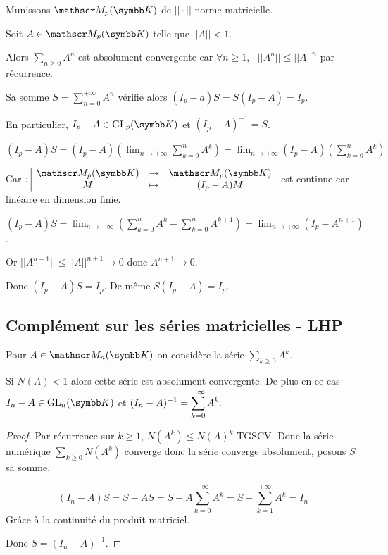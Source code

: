 \begin{exemple}
    Munissons $\mathscr M_p (\K)$ de $|| \cdot ||$ norme matricielle. 

    Soit $A \in \mathscr M_p(\K)$ telle que $|| A || < 1$. 

    Alors $\sum_{n \geqslant 0 } A^n$ est absolument convergente car 
    $\forall n \geqslant 1$, \, $|| A^n || \leqslant || A ||^n$ par récurrence. 

    Sa somme $\displaystyle S = \sum_{n = 0}^{+ \infty } A^n$ vérifie alors $(I_p - a ) S = S(I_p - A) = I_p$.

    En particulier, $I_p - A \in \operatorname{GL}_p (\K)$ et $(I_p - A)^{-1} = S$. 

    $\displaystyle (I_p - A)S = (I_p - A) \left(\lim_{n \to + \infty} \sum_{k = 0 }^{n } A^k \right) = \lim_{n \to + \infty} (I_p - A) \left( \sum_{k = 0}^{n } A^k \right) $

    Car $\fonction {}{\mathscr M_p(\K)}{\mathscr M_p(\K)}{M}{(I_p - A)M}$ est continue car linéaire
    en dimension finie. 

    $\displaystyle (I_p - A)S = \lim_{n \to + \infty} \left( \sum_{k = 0}^{n } A^k - \sum_{k = 0}^{n } A^{k + 1} \right) = \lim_{n \to + \infty} (I_p - A^{n + 1})$.

    Or $|| A^{n + 1} || \leqslant || A ||^{n + 1} \longrightarrow 0$ donc $A^{n + 1} \longrightarrow 0$.

    Donc $(I_p - A)S = I_p$. De même $S(I_p - A) = I_p$.
\end{exemple}

\subsection{Complément sur les séries matricielles - LHP}

Pour $A \in \mathscr M_n(\K)$ on considère la série $\sum_{k \geqslant 0} A^k$.

Si $N(A) < 1$ alors cette série est absolument convergente. De plus en ce cas $I_n - A \in \text{GL}_n(\K)$
et $\displaystyle (I_n - A)^{-1} = \sum_{k=0}^{+ \infty} A^k$.

\begin{proof}
Par récurrence sur $k \geqslant 1$, $N(A^k) \leqslant N(A)^k$ TGSCV.
Donc la série numérique $\sum_{k\geqslant 0} N(A^k)$ converge donc la série converge absolument, posons $S$ sa somme.

\[(I_n - A)S = S - AS = S - A \sum_{k=0}^{+ \infty} A^k = S - \sum_{k=1}^{+ \infty} A^k = I_n\]
Grâce à la continuité du produit matriciel.

Donc $S = (I_n - A)^{-1}$.
\end{proof}

